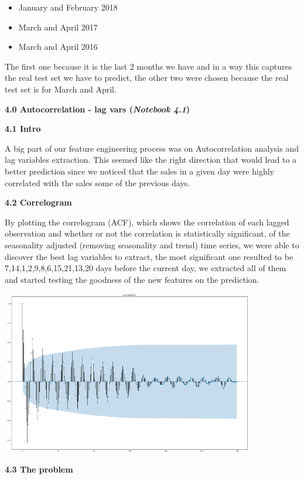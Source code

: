 \documentclass[]{article}
\begin{document}
\begin{itemize}
\item
  January and February 2018
\item
  March and April 2017
\item
  March and April 2016
\end{itemize}

The first one because it is the last 2 months we have and in a way this
captures the real test set we have to predict, the other two were chosen
because the real test set is for March and April.

\textbf{4.0 Autocorrelation - lag vars (\emph{Notebook 4.1})}

\protect\hypertarget{_ljbg98rvhi6s}{}{}\textbf{4.1 Intro}

A big part of our feature engineering process was on Autocorrelation
analysis and lag variables extraction. This seemed like the right
direction that would lead to a better prediction since we noticed that
the sales in a given day were highly correlated with the sales some of
the previous days.

\protect\hypertarget{_3u2bctnd1o96}{}{}\textbf{4.2 Correlogram}

By plotting the correlogram (ACF), which shows the correlation of each
lagged observation and whether or not the correlation is statistically
significant, of the seasonality adjusted (removing seasonality and
trend) time series, we were able to discover the best lag variables to
extract, the most significant one resulted to be
7,14,1,2,9,8,6,15,21,13,20 days before the current day, we extracted all
of them and started testing the goodness of the new features on the
prediction.

\includegraphics[width=4.35143in,height=2.83429in]{media/image8.png}

\textbf{4.3 The problem}
\end{document}

